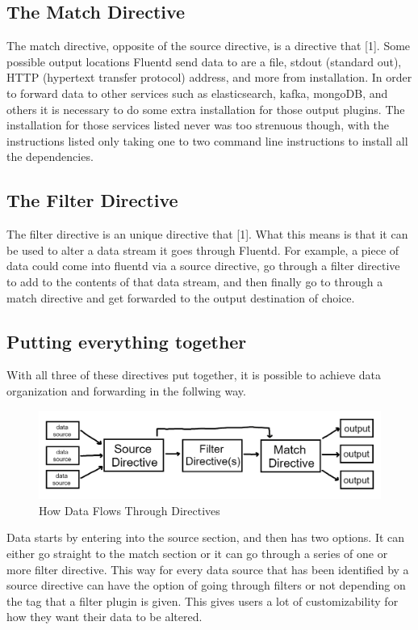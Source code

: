 \subsection{The Match Directive}
\quad \quad The match directive, opposite of the source directive, is a directive that [1]. Some possible output locations Fluentd 
send data to are a file, stdout (standard out), HTTP (hypertext transfer protocol) address, and more from installation. In order to forward data to
other services such as elasticsearch, kafka, mongoDB, and others it is necessary to do some extra installation for those output plugins. The installation for those services
listed never was too strenuous though, with the instructions listed only taking one to two command line instructions to install all the dependencies.
\subsection{The Filter Directive}
\quad \quad The filter directive is an unique directive that [1]. What this means is that it can be used to alter a data stream
it goes through Fluentd. For example, a piece of data could come into fluentd via a source directive, go through a filter directive to add to the contents of that data stream, and
then finally go to through a match directive and get forwarded to the output destination of choice.
\subsection{Putting everything together}
\quad \quad With all three of these directives put together, it is possible to achieve data organization and forwarding in the follwing way.
\begin{figure}[H]
    \centering
    \includegraphics[scale=1]{images/how_it_works.png}
    \caption{How Data Flows Through Directives}
    \label{fig:pic2}
\end{figure}
Data starts by entering into the source section, and then has two options. It can either go straight to the match section or it can go through a series of one or more filter directive. 
This way for every data source that has been identified by a source directive can have the option of going through filters or not depending on the tag that a filter plugin is given. This 
gives users a lot of customizability for how they want their data to be altered.
